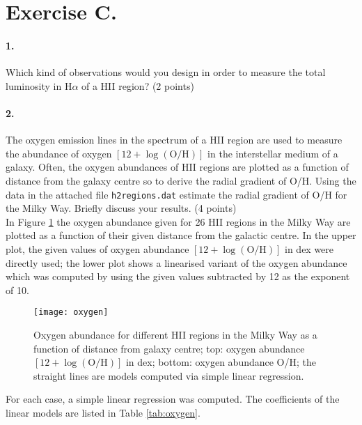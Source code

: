 \documentclass[11pt,a4paper,twoside]{article}
\begin{document}
\section*{Exercise C.}

\paragraph{1.} Which kind of observations would you design in order to measure the total luminosity in $\text{H}\alpha$ of a HII region? (2 points) \\


\paragraph{2.} The oxygen emission lines in the spectrum of a HII region are used to measure the abundance of oxygen $ \left[12 + \log{\left( \text{O/H} \right)} \right]$ in the interstellar medium of a galaxy. Often, the oxygen abundances of HII regions are plotted as a function of distance from the galaxy centre so to derive the radial gradient of O/H. Using the data in the attached file \verb+h2regions.dat+ estimate the radial gradient of O/H for the Milky Way. Briefly discuss your results. (4 points) \\

In Figure \ref{fig:oxygen} the oxygen abundance given for \num{26} HII regions in the Milky Way are plotted as a function of their given distance from the galactic centre. In the upper plot, the given values of oxygen abundance $ \left[12 + \log{\left( \text{O/H} \right)} \right]$ in dex were directly used; the lower plot shows a linearised variant of the oxygen abundance which was computed by using the given values subtracted by \num{12} as the exponent of \num{10}. \\

\begin{figure}[h!]
\centering
\texttt{[image: oxygen]}
\caption{Oxygen abundance for different HII regions in the Milky Way as a function of distance from galaxy centre; top: oxygen abundance $ \left[12 + \log{\left( \text{O/H} \right)} \right]$ in dex; bottom: oxygen abundance O/H; the straight lines are models computed via simple linear regression.}
\label{fig:oxygen}
\end{figure}

For each case, a simple linear regression was computed. The coefficients of the linear models are listed in Table \ref{tab:oxygen}. 
\end{document}
